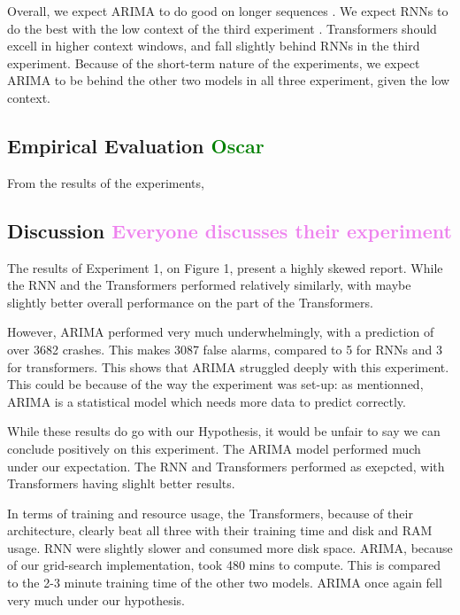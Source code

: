 \documentclass[12pt, letterpaper]{article}
\begin{document}
    
Overall, we expect ARIMA to do good on longer sequences \cite{ho2021}. We expect RNNs to do the best with the low context of the third experiment \cite{Hansika}. Transformers should excell in higher context windows, and fall slightly behind RNNs in the third experiment. Because of the short-term nature of the experiments, we expect ARIMA to be behind the other two models in all three experiment, given the low context.
\subsection*{Empirical Evaluation \textcolor{green}{Oscar}}
From the results of the experiments, 

\subsection*{Discussion \textcolor{violet}{Everyone discusses their experiment}}

The results of Experiment 1, on Figure 1, present a highly skewed report. While the RNN and the Transformers performed relatively similarly, with maybe slightly better overall performance on the part of the Transformers.

However, ARIMA performed very much underwhelmingly, with a prediction of over 3682 crashes. This makes 3087 false alarms, compared to 5 for RNNs and 3 for transformers. This shows that ARIMA struggled deeply with this experiment. This could be because of the way the experiment was set-up: as mentionned, ARIMA is a statistical model which needs more data to predict correctly.

While these results do go with our Hypothesis, it would be unfair to say we can conclude positively on this experiment. The ARIMA model performed much under our expectation. The RNN and Transformers performed as exepcted, with Transformers having slighlt better results.

In terms of training and resource usage, the Transformers, because of their architecture, clearly beat all three with their training time and disk and RAM usage. RNN were slightly slower and consumed more disk space. ARIMA, because of our grid-search implementation, took 480 mins to compute. This is compared to the 2-3 minute training time of the other two models. ARIMA once again fell very much under our hypothesis.
\end{document}
